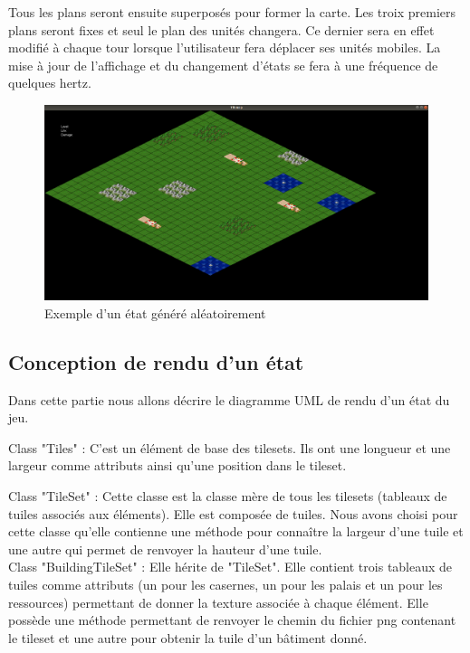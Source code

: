 \documentclass[12pt,a4paper]{article}
\begin{document}
Tous les plans seront ensuite superposés pour former la carte. Les troix premiers plans seront fixes et seul le plan des unités changera. Ce dernier sera en effet modifié à chaque tour lorsque l'utilisateur fera déplacer ses unités mobiles. La mise à jour de l'affichage et du changement d'états se fera à une fréquence de quelques hertz.

\newpage

\begin{figure}[!ht]
\centering
    \includegraphics[width=1\textwidth]{ressources/MapAlea.png}
     \caption{Exemple d'un état généré aléatoirement}
\end{figure}

\subsection{Conception de rendu d'un état}
Dans cette partie nous allons décrire le diagramme UML de rendu d'un état du jeu.

Class "Tiles" : C'est un élément de base des tilesets. Ils ont une longueur et une largeur comme attributs ainsi qu'une position dans le tileset.

Class "TileSet" : Cette classe est la classe mère de tous les tilesets (tableaux de tuiles associés aux éléments). Elle est composée de tuiles. Nous avons choisi pour cette classe qu'elle contienne une méthode pour connaître la largeur d'une tuile et une autre qui permet de renvoyer la hauteur d'une tuile.\\

Class "BuildingTileSet" :  Elle hérite de "TileSet". Elle contient trois tableaux de tuiles comme attributs (un pour les casernes, un pour les palais et un pour les ressources) permettant de donner la texture associée à chaque élément. Elle possède une méthode permettant de renvoyer le chemin du fichier png contenant le tileset et une autre pour obtenir la tuile d'un bâtiment donné. \\
\end{document}
